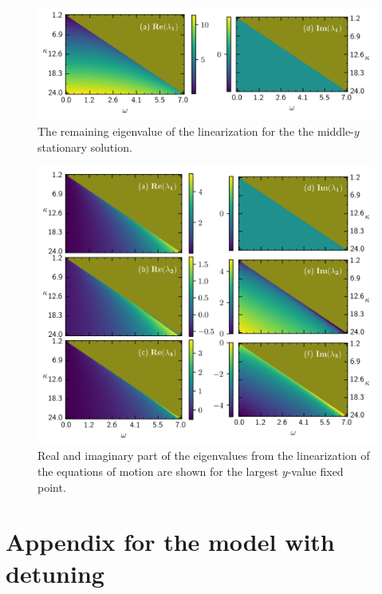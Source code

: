     \begin{figure}[H]
        \centering
        \includegraphics{pictures/lam_anal_m2.png}
        \caption{The remaining eigenvalue of the linearization for the the middle-$y$ stationary solution.
        }
    \end{figure}
    \begin{figure}[H]
        \centering
        \includegraphics{pictures/lam_anal_l.png}
        \caption{Real and imaginary part of the eigenvalues from the linearization of the equations of motion are shown for the largest $y$-value fixed point.
        }
    \end{figure}
    
    \chapter{Appendix for the model with detuning}
